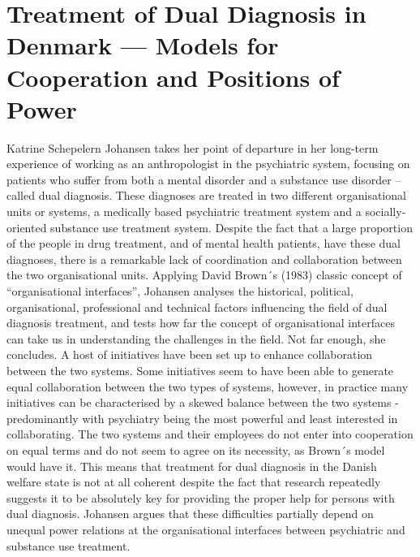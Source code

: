 \section{Treatment of Dual Diagnosis in Denmark --- Models for Cooperation and Positions of Power}
Katrine Schepelern Johansen takes her point of departure in her long-term experience of working as an anthropologist in the psychiatric system, focusing on patients who suffer from both a mental disorder and a substance use disorder – called dual diagnosis. These diagnoses are treated in two different organisational units or systems, a medically based psychiatric treatment system and a socially-oriented substance use treatment system. Despite the fact that a large proportion of the people in drug treatment, and of mental health patients, have these dual diagnoses, there is a remarkable lack of coordination and collaboration between the two organisational units. Applying David Brown´s (1983) classic concept of “organisational interfaces”, Johansen analyses the historical, political, organisational, professional and technical factors influencing the field of dual diagnosis treatment, and tests how far the concept of organisational interfaces can take us in understanding the challenges in the field. Not far enough, she concludes. A host of initiatives have been set up to enhance collaboration between the two systems. Some initiatives seem to have been able to generate equal collaboration between the two types of systems, however, in practice many initiatives can be characterised by a skewed balance between the two systems - predominantly with psychiatry being the most powerful and least interested in collaborating. The two systems and their employees do not enter into cooperation on equal terms and do not seem to agree on its necessity, as Brown´s model would have it. This means that treatment for dual diagnosis in the Danish welfare state is not at all coherent despite the fact that research repeatedly suggests it to be absolutely key for providing the proper help for persons with dual diagnosis. Johansen argues that these difficulties partially depend on unequal power relations at the organisational interfaces between psychiatric and substance use treatment.

\columnbreak %
